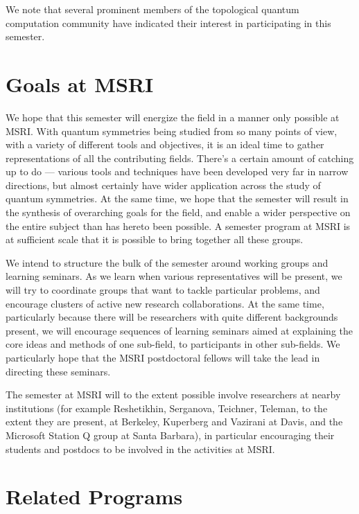 \documentclass[12pt]{article}
\begin{document}
We note that several prominent members of the topological quantum computation community have indicated their interest in participating in this semester.

\section{Goals at MSRI}
We hope that this semester will energize the field in a manner
only possible at MSRI. With quantum symmetries being studied from so many points of view, with a variety of different tools and objectives, it is an ideal time to gather representations of all the contributing fields. There's a certain amount of catching up to do --- various tools and techniques have been developed very far in narrow directions, but almost certainly have wider application across the study of quantum symmetries.  At the same time, we hope that the semester will result in the synthesis of overarching goals for the field, and enable a wider perspective on the entire subject than has hereto been possible. A semester program at MSRI is at sufficient scale that it is possible to bring together all these groups.

We intend to structure the bulk of the semester around working groups and learning seminars. As we learn when various representatives will be present, we will try to coordinate groups that want to tackle particular problems, and encourage clusters of active new research collaborations. At the same time, particularly because there will be researchers with quite different backgrounds present, we will encourage sequences of learning seminars aimed at explaining the core ideas and methods of one sub-field, to participants in other sub-fields. We particularly hope that the MSRI postdoctoral fellows will take the lead in directing these seminars.

The semester at MSRI will to the extent possible involve researchers at nearby institutions (for example Reshetikhin,  Serganova, Teichner, Teleman, to the extent they are present, at Berkeley, Kuperberg and Vazirani at Davis, and the Microsoft Station Q group at Santa Barbara), in particular encouraging their students and postdocs to be involved in the activities at MSRI.


\section{Related Programs}
\end{document}
